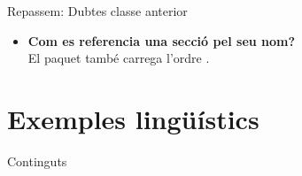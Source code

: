 
\date{17 de maig de 2024}

\subtitle{Tercera part}

\newcommand{\mar}[1]{\todo[color=green!40]{#1}}
\newcommand{\andreu}[1]{\todo[color=purple!40]{#1}}



\begin{frame}
\titlepage{}
\end{frame}

\begin{frame}[fragile]{Repassem: Dubtes classe anterior}
\begin{itemize}
    \item \textbf{Com es referencia una secció pel seu nom?}\\
    El paquet  també carrega l'ordre .
\begin{exampletwouptiny}
\end{exampletwouptiny}
\end{itemize}
\end{frame}

\section{Exemples lingüístics}\label{sec:exemples_ling}
\begin{frame}{Continguts}
\begin{multicols}{2}
\tableofcontents[currentsection]
\end{multicols}
\end{frame}


